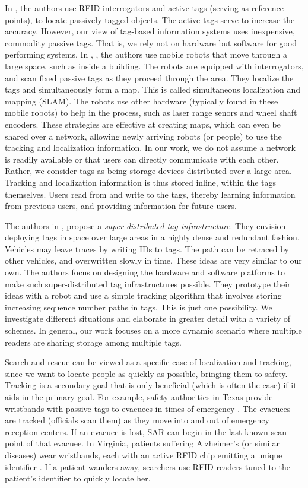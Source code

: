 In \cite{2004 Ni}, the authors use RFID interrogators and active tags (serving as reference points), to locate passively tagged objects. The active tags serve to increase the accuracy. However, our view of tag-based information systems uses inexpensive, commodity passive tags. That is, we rely not on hardware but software for good performing systems. In \cite{2004 Hahnel}, \cite{2006 Kleiner}, the authors use mobile robots that move through a large space, such as inside a building. The robots are equipped with interrogators, and scan fixed passive tags as they proceed through the area. They localize the tags and simultaneously form a map. This is called simultaneous localization and mapping (SLAM). The robots use other hardware (typically found in these mobile robots) to help in the process, such as laser range senors and wheel shaft encoders. These strategies are effective at creating maps, which can even be shared over a network, allowing newly arriving robots (or people) to use the tracking and localization information. In our work, we do not assume a network is readily available or that users can directly communicate with each other. Rather, we consider tags as being storage devices distributed over a large area. Tracking and localization information is thus stored inline, within the tags themselves. Users read from and write to the tags, thereby learning information from previous users, and providing information for future users. 

The authors in \cite{2004 Bohn}, \cite{2006 Bohn} propose a \emph{super-distributed tag infrastructure}.  They envision deploying tags in space over large areas in a highly dense and redundant fashion.  Vehicles may leave traces by writing IDs to tags.  The path can be retraced by other vehicles, and overwritten slowly in time. These ideas are very similar to our own. The authors focus on designing the hardware and software platforms to make such super-distributed tag infrastructures possible. They prototype their ideas with a robot and use a simple tracking algorithm that involves storing increasing sequence number paths in tags. This is just one possibility. We investigate different situations and elaborate in greater detail with a variety of schemes. In general, our work focuses on a more dynamic scenario where multiple readers are sharing storage among multiple tags.

Search and rescue can be viewed as a specific case of localization and tracking, since we want to locate people as quickly as possible, bringing them to safety.  Tracking is a secondary goal that is only beneficial (which is often the case) if it aids in the primary goal.  For example, safety authorities in Texas provide wristbands with passive tags to evacuees in times of emergency \cite{2008 Burnell}.  The evacuees are tracked (officials scan them) as they move into and out of emergency reception centers.  If an evacuee is lost, SAR can begin in the last known scan point of that evacuee.  In Virginia, patients suffering Alzheimer's (or similar diseases) wear wristbands, each with an active RFID chip emitting a unique identifier \cite{2007 Swedberg}.  If a patient wanders away, searchers use RFID readers tuned to the patient's identifier to quickly locate her.

